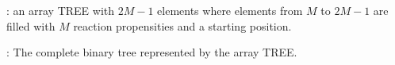 \begin{algorithm}[H]
\DontPrintSemicolon
{}

\caption{\protect{}}
\label{algo:build-tree}

\Input: an array TREE with $2M-1$ elements where elements from $M$ to $2M-1$ are filled with $M$ reaction propensities and a starting position.\;

\Output: The complete binary tree represented by the array TREE.\;



\end{algorithm}
